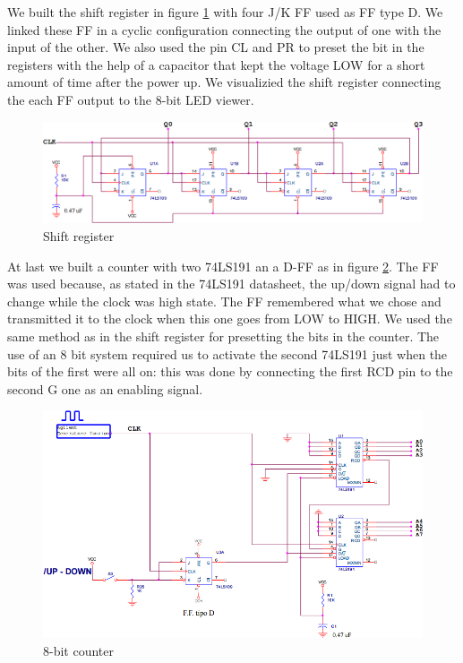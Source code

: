 We built the shift register in figure \ref{shift_reg} with four J/K FF used as FF type D. We linked these FF in a cyclic configuration connecting the output of one with the input of the other. We also used the pin CL and PR to preset the bit in the registers with the help of a capacitor that kept the voltage LOW for a short amount of time after the power up. We visualizied the shift register connecting the each FF output to the 8-bit LED viewer.
\begin{figure}[H]
\centering
\includegraphics[width=.7\textwidth]{11/shift_reg.png}
\caption{Shift register}\label{shift_reg}
\end{figure}
At last we built a counter with two 74LS191 an a D-FF as in figure \ref{count}. The FF was used because, as stated in the 74LS191 datasheet, the up/down signal had to change while the clock was high state. The FF remembered what we chose and transmitted it to the clock when this one goes from LOW to HIGH. We used the same method as in the shift register for presetting the bits in the counter. The use of an 8 bit system required us to activate the second 74LS191 just when the bits of the first were all on: this was done by connecting the first RCD pin to the second G one as an enabling signal.
\begin{figure}[H]
\centering
\includegraphics[width=.7\textwidth]{11/count.png}
\caption{8-bit counter}\label{count}
\end{figure}

